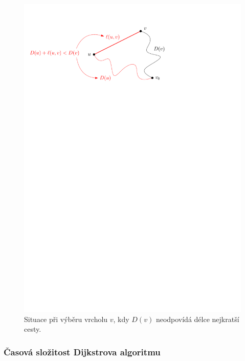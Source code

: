 \begin{figure}[h]
    \centering
    \includegraphics[scale=\graphimgsize]{01-grafalgo/images/ch01_dijkstra_vyber_vrcholu.pdf}
    \caption{Situace při výběru vrcholu $v$, kdy $D(v)$ neodpovídá délce nejkratší cesty.}
    \label{fig:dijkstra_vyber_vrcholu}
\end{figure}

\subsubsection{Časová složitost Dijkstrova algoritmu}

